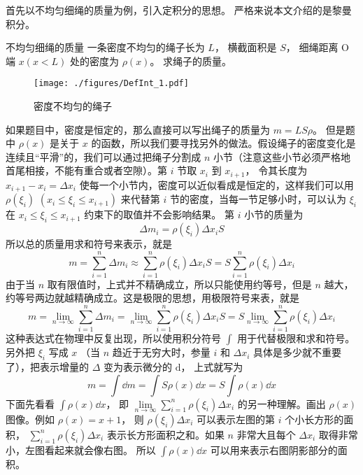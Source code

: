 

首先以不均匀细绳的质量为例，引入定积分的思想。 严格来说本文介绍的是黎曼积分。

\begin{example}{不均匀细绳的质量}\label{DefInt_ex1}
一条密度不均匀的绳子长为 $L$， 横截面积是 $S$， 细绳距离 O 端 $x (x<L) $ 处的密度为 $\rho(x)$。 求绳子的质量。

\begin{figure}[ht]
\centering
\texttt{[image: ./figures/DefInt\_1.pdf]}
\caption{密度不均匀的绳子}
\end{figure}

如果题目中，密度是恒定的，那么直接可以写出绳子的质量为 $m = LS\rho$。 但是题中 $\rho(x)$ 是关于 $x$ 的函数，所以我们要寻找另外的做法。假设绳子的密度变化是连续且“平滑”的，我们可以通过把绳子分割成 $n$ 小节（注意这些小节必须严格地首尾相接，不能有重合或者空隙）。第 $i$ 节取 $x_i$ 到 $x_{i +1}$， 令其长度为 $x_{i + 1} - {x_i} = \Delta x_i$ 使每一个小节内，密度可以近似看成是恒定的，这样我们可以用 $\rho(\xi_i)\,\, (x_i \leqslant \xi_i \leqslant x_{i + 1})$ 来代替第 $i$ 节的密度，当每一节足够小时，可以认为 $\xi_i$ 在 $x_i \leqslant \xi_i \leqslant x_{i + 1}$ 约束下的取值并不会影响结果。 第 $i$ 小节的质量为
\begin{equation}
\Delta {m_i} = \rho (\xi_i)\Delta {x_i}S 
\end{equation}
所以总的质量用求和符号来表示，就是
\begin{equation}
m = \sum_{i = 1}^n \Delta m_i  \approx \sum_{i = 1}^n \rho(\xi_i)\Delta x_i S   = S \sum_{i = 1}^n \rho (\xi_i)\Delta x_i
\end{equation}
由于当 $n$ 取有限值时，上式并不精确成立，所以只能使用约等号，但是 $n$ 越大，约等号两边就越精确成立。这是极限的思想，用极限符号来表，就是
\begin{equation}
m = \lim_{n \to \infty } \sum_{i = 1}^n {\Delta {m_i}}  = \lim_{n \to \infty } \sum_{i = 1}^n \rho(\xi_i)\Delta {x_i}S   = S   \lim_{n \to \infty } \sum_{i = 1}^n \rho(\xi_i)\Delta {x_i}
\end{equation}
这种表达式在物理中反复出现，所以使用积分符号 $\int {} $ 用于代替极限和求和符号。另外把 ${\xi_i}$ 写成 $x$ （当 $n$ 趋近于无穷大时，参量 $i$ 和 $\Delta {x_i}$ 具体是多少就不重要了），把表示增量的 $\Delta $ 变为表示微分的 $\mathrm{d}$， 上式就写为
\begin{equation}
m = \int \dd{m}  = \int S\rho(x) \dd{x}  = S\int \rho(x) \dd{x}
\end{equation}
下面先看看 $\int \rho(x) \dd{x}$， 即 $\lim\limits_{n \to \infty } \sum\limits_{i = 1}^n \rho(\xi_i)\Delta {x_i}$ 的另一种理解。画出 $\rho (x)$ 图像。例如 $\rho(x) = x + 1$， 则 $\rho(\xi_i)\Delta {x_i}$ 可以表示左图的第 $i$ 个小长方形的面积， $\sum\limits_{i = 1}^n \rho(\xi_i)\Delta x_i$ 表示长方形面积之和。如果 $n$ 非常大且每个 $\Delta x_i$ 取得非常小，左图看起来就会像右图。 所以 $\int \rho(x) \dd{x}$ 可以用来表示右图阴影部分的面积。


\end{example}
